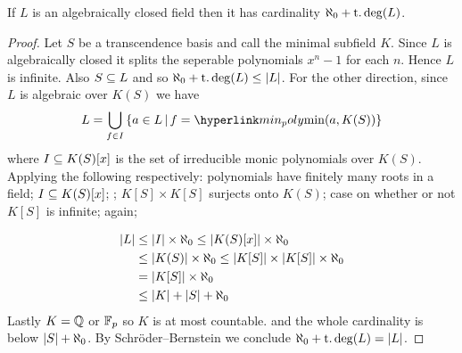\begin{lem}
    If $L$ is an algebraically closed field then it has cardinality
    $\aleph_0 + \operatorname{t.deg}(L)$.
\end{lem}
\begin{proof}
    Let $S$ be a transcendence basis and call the minimal subfield $K$.
    Since $L$ is algebraically closed it splits the seperable polynomials
    $x^n - 1$ for each $n$. 
    Hence $L$ is infinite.
    Also $S \subseteq L$ and so $\aleph_0 + \operatorname{t.deg}(L) \leq \left\vert L \right\vert$.
    For the other direction, since $L$ is algebraic over $K(S)$ we have
    \[
        L = 
        \bigcup_{f \in I}\set{a \in L \st f = \linkto{min_poly}{\min(a,K(S))}}
    \]
    where $I \subseteq K(S)[x]$ is the set of irreducible monic
    polynomials over $K(S)$.
    Applying the following respectively:
    polynomials have finitely many roots in a field;
    $I \subseteq K(S)[x]$;
    ;
    $K[S]\times K[S]$ surjects onto $K(S)$;
    case on whether or not $K[S]$ is infinite;
     again;

    \begin{align*}
      \left\vert L \right\vert &\leq \left\vert I \right\vert \times \aleph_0
      \leq \left\vert K(S)[x] \right\vert \times \aleph_0\\
      &\leq \left\vert K(S) \right\vert \times \aleph_0
      \leq \left\vert K[S] \right\vert\times \left\vert K[S] \right\vert \times \aleph_0\\
      &= \left\vert K[S] \right\vert \times \aleph_0 \\
      &\leq \left\vert K \right\vert + \left\vert S \right\vert + \aleph_{0}
    \end{align*}
    Lastly $K = \mathbb{Q}$ or $\mathbb{F}_p$ so $K$ is at most countable.
    and the whole cardinality is below $\left\vert S \right\vert + \aleph_{0}$.
    By Schröder–Bernstein we conclude $\aleph_0 + \operatorname{t.deg}(L) = \left\vert L \right\vert$.
\end{proof}

